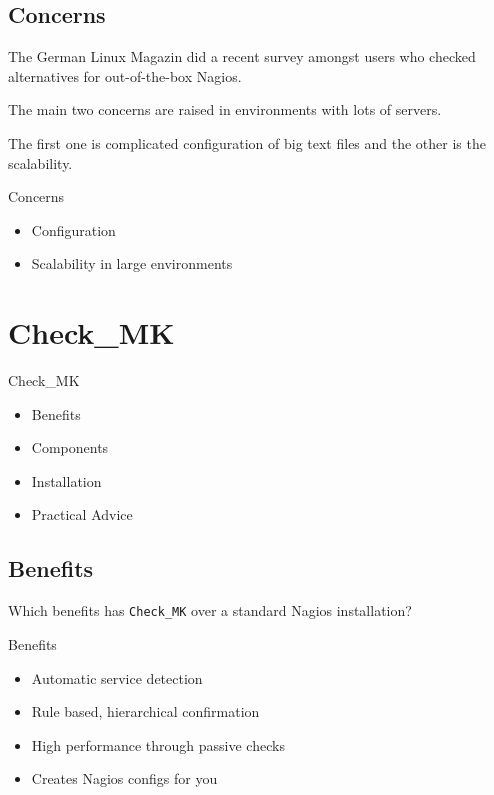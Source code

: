 \subsection{Concerns}

The German Linux Magazin did a recent survey amongst users
who checked alternatives for out-of-the-box Nagios.

The main two concerns are raised in environments with lots
of servers.

The first one is complicated configuration of big text files
and the other is the scalability.

\begin{frame}{Concerns}

\begin{itemize}
\item Configuration
\item Scalability in large environments
\end{itemize}
\end{frame}

\section{Check\_MK}

\begin{frame}[fragile]{Check\_MK}
\begin{itemize}
\item Benefits
\item Components
\item Installation
\item Practical Advice
\end{itemize}
\end{frame}

\subsection{Benefits}

Which benefits has \verb|Check_MK| over a standard Nagios installation?

\begin{frame}[fragile]{Benefits}
\begin{itemize}
\item Automatic service detection
\item Rule based, hierarchical confirmation
\item High performance through passive checks
\item Creates Nagios configs for you
\end{itemize}
\end{frame}


